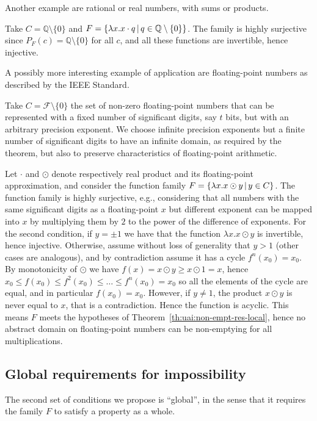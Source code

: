 Another example are rational or real numbers, with sums or products.
\begin{example}
	Take $C = \mathbb{Q} \setminus \{ 0 \}$ and $F = \{ \lambda x. x \cdot q \,\vert\, q \in \mathbb{Q} \setminus \{ 0 \} \}$.
	The family is highly surjective since $P_F(c) = \mathbb{Q} \setminus \{ 0 \}$ for all $c$, and all these functions are invertible, hence injective.
\end{example}
A possibly more interesting example of application are floating-point numbers as described by the IEEE Standard.
\begin{example}\label{ex:uai:fp-numbers-local}
	Take $C = \mathcal{F} \setminus \{ 0 \}$ the set of non-zero floating-point numbers that can be represented with a fixed number of significant digits, say $t$ bits, but with an arbitrary precision exponent. We choose infinite precision exponents but a finite number of significant digits to have an infinite domain, as required by the theorem, but also to preserve characteristics of floating-point arithmetic.

	Let $\cdot$ and $\odot$ denote respectively real product and its floating-point approximation, and consider the function family $F = \{ \lambda x . x \odot y \,\vert\, y \in C \}$. The function family is highly surjective, e.g., considering that all numbers with the same significant digits as a floating-point $x$ but different exponent can be mapped into $x$ by multiplying them by $2$ to the power of the difference of exponents.
	For the second condition, if $y = \pm 1$ we have that the function $\lambda x. x \odot y$ is invertible, hence injective. Otherwise, assume without loss of generality that $y > 1$ (other cases are analogous), and by contradiction assume it has a cycle $f^{n}(x_0) = x_0$. By monotonicity of $\odot$ we have 	$f(x) = x \odot y \ge x \odot 1 = x$, hence $x_0 \le f(x_0) \le f^2(x_0) \le \dots \le f^n(x_0) = x_0$ so all the elements of the cycle are equal, and in particular $f(x_0) = x_0$. However, if $y \neq 1$, the product $x \odot y$ is never equal to $x$, that is a contradiction. Hence the function is acyclic.
	This means $F$ meets the hypotheses of Theorem~\ref{th:uai:non-empt-res-local}, hence no abstract domain on floating-point numbers can be non-emptying for all multiplications.
\end{example}

\subsection{Global requirements for impossibility}
The second set of conditions we propose is ``global'', in the sense that it requires the family $F$ to satisfy a property as a whole.

